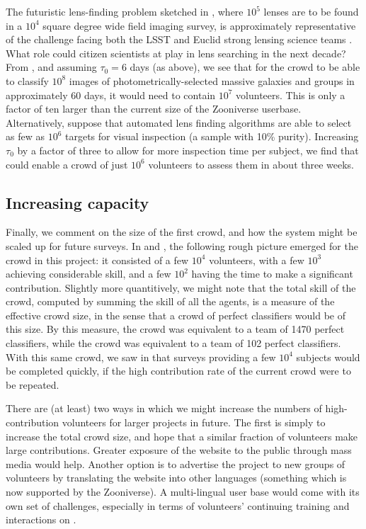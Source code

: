 \documentclass[useAMS,usenatbib,a4paper]{mn2e}
\begin{document}
The futuristic lens-finding problem sketched in , where $10^5$
lenses are to be found in a $10^4$ square degree wide field imaging survey, is
approximately representative of the challenge facing both the LSST and Euclid
strong lensing science teams \citep{LSSTSciBook,EuclidSciBook}. What role could
citizen scientists at \SW play in lens searching in the next decade? From
, and assuming $\tau_0 = 6$ days (as above), we see that for the
\SW crowd to be able to classify $10^8$ images of  photometrically-selected
massive galaxies and groups in approximately 60 days, it would need to contain
$10^7$ volunteers. This is only  a factor of ten larger than the current size of
the Zooniverse userbase. Alternatively, suppose that automated  lens finding
algorithms are able to select as few as $10^6$ targets for visual inspection (a
sample with 10\% purity). Increasing $\tau_0$ by a factor of three to allow for
more inspection time per subject,  we find that \SW could enable a crowd of just
$10^6$ volunteers to assess them in about three  weeks.


\subsection{Increasing capacity}
\label{sec:discuss:capacity}

Finally, we comment on the size of the first \SW crowd, and how the system might
be scaled up for future surveys. In  and
, the following rough picture emerged for the \SW
crowd in this project: it consisted of a few $10^4$ volunteers, with a few
$10^3$ achieving considerable skill, and a few $10^2$ having the time to make a
significant contribution. Slightly more quantitively, we might note that  the
total skill of the crowd, computed by summing the skill of all the agents, is a
measure of the effective crowd size, in the sense that a crowd of perfect
classifiers would be of this size. By this measure, the \StageOne crowd was
equivalent to a team of 1470 perfect classifiers, while the \StageTwo crowd was
equivalent to a team of 102 perfect classifiers. With this same crowd, we saw in
  that surveys providing a few $10^4$ subjects would be
completed quickly, if the high contribution rate of the current crowd were to be
repeated.

There are (at least) two ways in which we might increase the numbers of
high-contribution volunteers for larger projects in future. The first is
simply to increase the total crowd size, and hope that a similar fraction of
volunteers make large contributions. Greater exposure of the website to the
public through mass media would help. Another option is to advertise the
project to new groups of volunteers by translating the website into other
languages (something which is now supported by the Zooniverse). A
multi-lingual user base would come with its own set of challenges, especially
in terms of volunteers' continuing training and interactions on \Talk.
\end{document}
